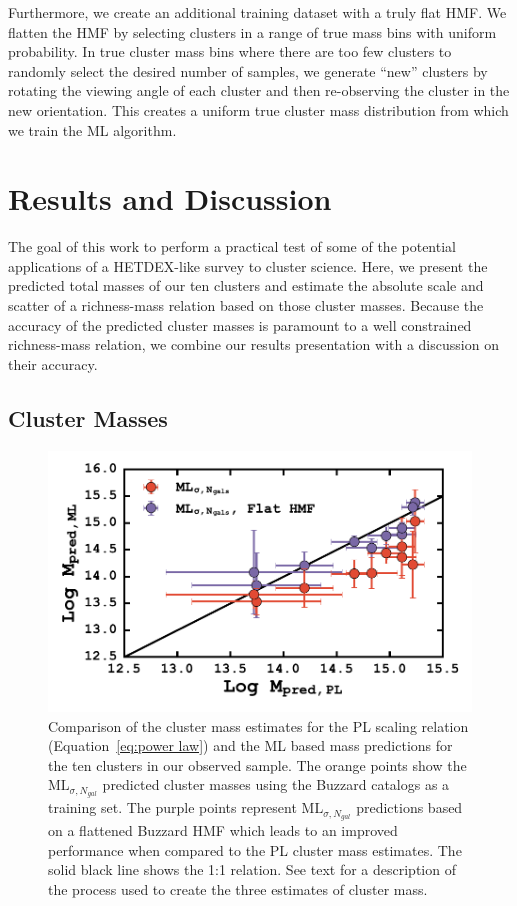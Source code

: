 Furthermore, we create an additional training dataset with a truly flat HMF. We flatten the HMF by selecting clusters in a range of true mass bins with uniform probability. In true cluster mass bins where there are too few clusters to randomly select the desired number of samples, we generate ``new'' clusters by rotating the viewing angle of each cluster and then re-observing the cluster in the new orientation. This creates a uniform true cluster mass distribution from which we train the ML algorithm. 

\section{Results and Discussion}\label{2sec:results}
The goal of this work to perform a practical test of some of the potential applications of a HETDEX-like survey to cluster science. Here, we present the predicted total masses of our ten clusters and estimate the absolute scale and scatter of a richness-mass relation based on those cluster masses. Because the accuracy of the predicted cluster masses is paramount to a well constrained richness-mass relation, we combine our results presentation with a discussion on their accuracy. 
 
\subsection{Cluster Masses}
\begin{figure}[!ht] 
	\begin{center}
		\includegraphics[width=\textwidth]{figures2/massCompare.pdf} 
	\end{center}
	\caption[PL estimated cluster versus ML predicted cluster mass]{Comparison of the cluster mass estimates for the PL scaling relation (Equation~\ref{eq:power law}) and the ML based mass predictions for the ten clusters in our observed sample. The orange points show the $\mathrm{ML}_{\sigma, N_{gal}}$ predicted cluster masses using the Buzzard catalogs as a training set. The purple points represent $\mathrm{ML}_{\sigma, N_{gal}}$ predictions based on a flattened Buzzard HMF which leads to an improved performance when compared to the PL cluster mass estimates. The solid black line shows the 1:1 relation. See text for a description of the process used to create the three estimates of cluster mass.}
 \label{2fig: ML comparison} 
\end{figure}

